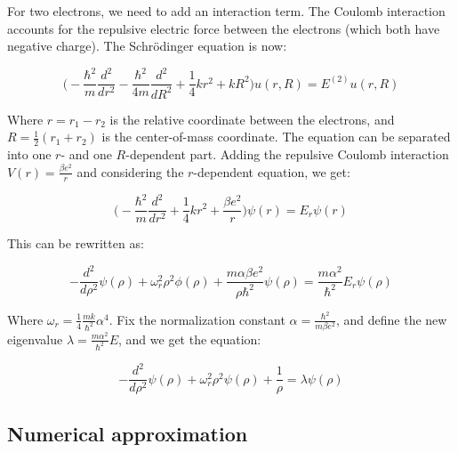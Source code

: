 \documentclass[11pt]{article}
\begin{document}
\begin{flushleft}
For two electrons, we need to add an interaction term. The Coulomb interaction accounts for the repulsive electric force between the electrons (which both have negative charge). The Schrödinger equation is now: 

\begin{equation}
\big( -\frac{\hbar^2}{m} \frac{d^2}{dr^2} - \frac{\hbar^2}{4m} \frac{d^2}{dR^2} + \frac{1}{4} kr^2 + kR^2 \big) u(r,R) = E^{(2)}u(r,R)
\end{equation}

Where $r=r_1-r_2$ is the relative coordinate between the electrons, and $R=\frac{1}{2} (r_1 +r_2)$ is the center-of-mass coordinate. The equation can be separated into one $r$- and one $R$-dependent part. Adding the repulsive Coulomb interaction $V(r) = \frac{\beta e^2}{r}$ and considering the $r$-dependent equation, we get:

\begin{equation}
\Big( - \frac{\hbar^2}{m}\frac{d^2}{dr^2} + \frac{1}{4} kr^2 + \frac{\beta e^2}{r}\Big) \psi (r) = E_r \psi(r)
\end{equation}

This can be rewritten as:

\begin{equation}
-\frac{d^2}{d \rho^2} \psi(\rho) + \omega_r^2 \rho^2 \phi (\rho) + \frac{m \alpha \beta e^2}{\rho \hbar^2} \psi (\rho) = \frac{m \alpha^2}{\hbar^2} E_r \psi (\rho)
\end{equation}


Where $\omega_r = \frac{1}{4} \frac{mk}{\hbar^2} \alpha^4 $. Fix the normalization constant $\alpha = \frac{\hbar^2}{m \beta e^2}$, and define the new eigenvalue $\lambda = \frac{m\alpha^2}{\hbar^2} E$, and we get the equation: 

\begin{equation}
-\frac{d^2}{d \rho^2} \psi (\rho) + \omega_r^2 \rho^2 \psi(\rho) + \frac{1}{\rho} = \lambda \psi (\rho)
\end{equation}

\end{flushleft}

\subsection*{Numerical approximation}
\end{document}
